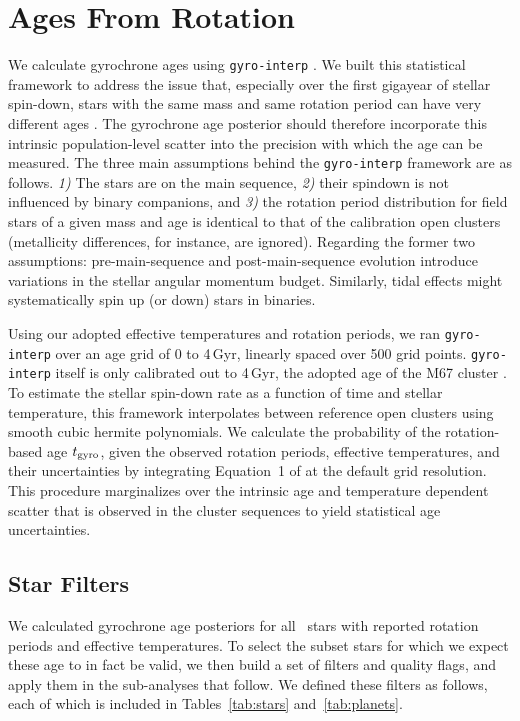 \documentclass[11pt,twocolumn,tighten]{aastex63}
\begin{document}



\section{Ages From Rotation}
\label{sec:rotage}

We calculate gyrochrone ages using \texttt{gyro-interp}
\citep{Bouma_2023}.  We built this statistical framework to address
the issue that, especially over the first gigayear of stellar
spin-down, stars with the same mass and same rotation period can have
very different ages \citep[e.g.][]{Curtis_2019_ngc6811}.  The
gyrochrone age posterior should therefore incorporate this intrinsic
population-level scatter into the precision with which the age can be
measured.  The three main assumptions behind the \texttt{gyro-interp}
framework are as follows.  {\it 1)} The stars are on the main
sequence, {\it 2)} their spindown is not influenced by binary
companions, and {\it 3)} the rotation period distribution for field
stars of a given mass and age is identical to that of the calibration
open clusters (metallicity differences, for instance, are ignored).  
Regarding the former two assumptions: pre-main-sequence and
post-main-sequence evolution introduce variations in the stellar
angular momentum budget.  Similarly, tidal effects might
systematically spin up (or down) stars in binaries.

Using our adopted effective temperatures and rotation periods, we ran
\texttt{gyro-interp} over an age grid of 0 to 4\,Gyr, linearly spaced
over 500 grid points.  \texttt{gyro-interp} itself is only calibrated
out to 4\,Gyr, the adopted age of the M67 cluster
\citep[see][]{Dungee_2022,Gruner_2023}.  To estimate the stellar
spin-down rate as a function of time and stellar temperature, this
framework interpolates between reference open clusters using smooth
cubic hermite polynomials.  We calculate the probability of the
rotation-based age $t_{\rm gyro}$, given the observed rotation
periods, effective temperatures, and their uncertainties by
integrating Equation~1 of \citep{Bouma_2023} at the default grid
resolution.  This procedure marginalizes over the intrinsic age and
temperature dependent scatter that is observed in the cluster
sequences to yield statistical age uncertainties.


\subsection{Star Filters}
\label{subsec:filters}
We calculated gyrochrone age posteriors for all \nuniqstarsantosrot\
stars with reported rotation periods and effective temperatures.  To
select the subset stars for which we expect these age to in fact be
valid, we then build a set of filters and quality flags, and apply
them in the sub-analyses that follow.  We defined these filters as
follows, each of which is included in Tables~\ref{tab:stars}
and~\ref{tab:planets}.
\end{document}
